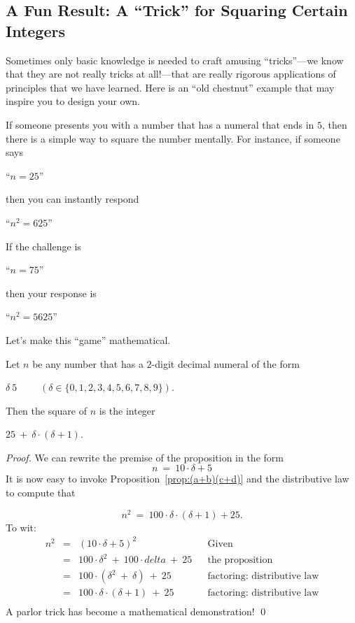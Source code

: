 \subsection{A Fun Result: A ``Trick'' for Squaring Certain Integers}

Sometimes only basic knowledge is needed to craft amusing
``tricks''---we know that they are not really tricks at all!---that
are really rigorous applications of principles that we have learned.
Here is an ``old chestnut'' example that may inspire you to design
your own. 

If someone presents you with a number that has a numeral that ends in
$5$, then there is a simple way to square the number mentally.  For
instance, if someone says

\hspace{.25in}``$n = 25$''

\noindent
then you can instantly respond

\hspace{.25in}``$n^2 = 625$''

\noindent
If the challenge is

\hspace{.25in}``$n = 75$''

\noindent
then your response is

\hspace{.25in}``$n^2 = 5625$''

\noindent
Let's make this ``game'' mathematical.

\begin{prop}
\label{thm:75x65=4925}
Let $n$ be any number that has a $2$-digit decimal numeral of the form

\hspace{.25in}$\delta \ 5$ \ \ \ \ $(\delta \in \{ 0,1,2,3,4,5,6,7,8,9\})$.

\noindent
Then the square of $n$ is the integer

\hspace{.25in}$25 \ + \ \delta \cdot (\delta +1)$. 
\end{prop}

\begin{proof}
We can rewrite the premise of the proposition in the form
\[ n \ = \ 10 \cdot \delta + 5 \]
It is now easy to invoke Proposition~\ref{prop:(a+b)(c+d)} and the
distributive law to compute that

\[ n^2 \ = \ 100 \cdot \delta \cdot (\delta+1) + 25. \]
To wit: 
\[
\begin{array}{lclll}
n^2 & = & (10 \cdot \delta + 5)^2 & & \mbox{Given} \\
    & = & 100 \cdot \delta^2 \ + \ 100 \cdot delta \ + \ 25
              & & \mbox{the proposition} \\
    & = & 100 \cdot (\delta^2 \ + \ \delta) \ + \ 25
              & & \mbox{factoring: distributive law} \\
    & = & 100 \cdot \delta \cdot (\delta + 1) \ + \ 25
              & & \mbox{factoring: distributive law} \\
\end{array}
\]
A parlor trick has become a mathematical demonstration!
\qed
\end{proof}


